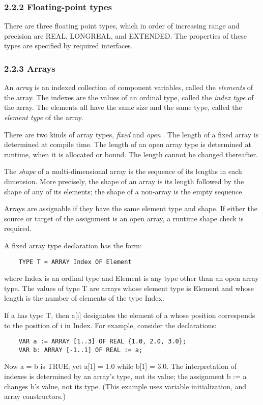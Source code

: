 \documentclass[10pt]{article}
\begin{document}
\subsubsection*{2.2.2 Floating-point types}

There are three floating point types, which in order of increasing range and
precision are REAL, LONGREAL, and EXTENDED.  The properties of these types are
specified by required interfaces.

\subsubsection*{2.2.3 Arrays}

An \emph{array} is an indexed collection of component variables, called the
\emph{elements} of the array.  The indexes are the values of an ordinal type,
called the \emph{index type} of the array.  The elements all have the same size
and the same type, called the \emph{element type} of the array.

There are two kinds of array types, \emph{fixed} and \emph{open} .  The length
of a fixed array is determined at compile time.  The length of an open array
type is determined at runtime, when it is allocated or bound.  The length
cannot be changed thereafter.

The \emph{shape} of a multi-dimensional array is the sequence of its lengths
in each dimension.  More precisely, the shape of an array is its length
followed by the shape of any of its elements; the shape of a non-array is the
empty sequence.

Arrays are assignable if they have the same element type and shape.  If either
the source or target of the assignment is an open array, a runtime shape check
is required.

A fixed array type declaration has the form:
\begin{verbatim}
    TYPE T = ARRAY Index OF Element
\end{verbatim}
where Index is an ordinal type and Element is any type other than an open
array type.  The values of type T are arrays whose element type is Element and
whose length is the number of elements of the type Index.

If a has type T, then a[i] designates the element of a whose position
corresponds to the position of i in Index.  For example, consider the
declarations:
\begin{verbatim}
    VAR a := ARRAY [1..3] OF REAL {1.0, 2.0, 3.0};
    VAR b: ARRAY [-1..1] OF REAL := a;
\end{verbatim}
Now a = b is TRUE; yet a[1] = 1.0 while b[1] = 3.0.  The interpretation of
indexes is determined by an array's type, not its value; the assignment b := a
changes b's value, not its type.  (This example uses variable initialization,
and array constructors.)
\end{document}
